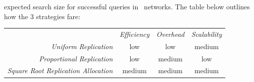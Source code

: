 expected search size for successful queries in \p\ networks.
The table below outlines how the $3$ strategies fare:
\begin{center}
{\footnotesize
\begin{tabular}{rccc}
\multicolumn{1}{r}{} &
\multicolumn{1}{c}{\emph{Efficiency}} &
\multicolumn{1}{c}{\emph{Overhead}} &
\multicolumn{1}{c}{\emph{Scalability}}
\\
\cline{2-4}
\emph{Uniform Replication} &
low &
low &
%
medium \\
\emph{Proportional Replication} &
low &
medium &
%
low \\
\emph{Square Root Replication Allocation} &
medium &
medium &
medium \\
\end{tabular}
}
\end{center}

